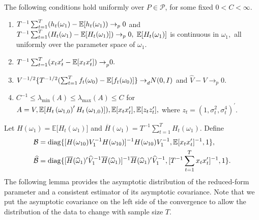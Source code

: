 \begin{assumpR}
    \label{assump:R}
    The following conditions hold uniformly over $P\in \mathcal{P}$, for some fixed $0 < C < \infty$.
    
    \begin{enumerate}
        \item $T^{-1}\sum_{t=1}^{T}(h_{t}(\omega_{1})-\operatorname{\mathbb{E}}[ h_{t}(\omega _{1}))\rightarrow _{p}0$ and $T^{-1}\sum_{t=1}^{T}(H_{t}(\omega _{1})-\operatorname{\mathbb{E}}[H_{t}(\omega _{1})])\rightarrow _{p}0,$ $\operatorname{\mathbb{E}}[H_{t}(\omega _{1})]$ is continuous in $\omega _{1},$ all uniformly over the parameter space of $\omega _{1}$.
        \item $T^{-1}\sum_{t=1}^{T}(x_{t}x_{t}^{\prime }-\operatorname{\mathbb{E}}[ x_{t}x_{t}^{\prime }{])\rightarrow }_{p}0.$
        \item $V^{-1/2}\{T^{-1/2}(\sum_{t=1}^{T}f_{t}(\omega _{0})-\operatorname{\mathbb{E}}[f_{t}(\omega _{0}){]\} \rightarrow }_{d}N(0,I)$ and $\widehat{V} -V\rightarrow _{p}0.$
        \item $C^{-1}\leq \lambda_{\min }(A)\leq \lambda_{\max }(A)\leq C$ for $A=V,\operatorname{\mathbb{E}}[H_{t}\left( \omega _{1,0}\right) ^{\prime }H_{t}\left( \omega _{1,0}\right) ]),\operatorname{\mathbb{E}}[x_{t}x_{t}^{\prime }],\operatorname{\mathbb{E}}[ z_{t}z_{t}^{\prime }],$ where $z_{t}=(1,\sigma _{t}^{2},\sigma _{t}^{4})^{\prime }.$
    \end{enumerate}
\end{assumpR}


Let $H(\omega _{1})=\mathbb{E[}H_{t}(\omega _{1})]$ and $\overline{H}(\omega _{1})=T^{-1}\sum_{t=1}^{T}H_{t}(\omega _{1}).$ Define
%
\begin{align}
%
    \mathcal{B} &= \diag\{[H(\omega _{10})V_{1}^{-1}H(\omega _{10})]^{-1}H(\omega _{10})V_{1}^{-1},\mathbb{E[}x_{t}x_{t}^{\prime }]^{-1},1\},  \notag \\
%
    \widehat{\mathcal{B}} &= \diag\{[\overline{H}(\widehat{\omega }_{1})^{\prime } \widehat{V}_{1}^{-1}\overline{H}(\widehat{\omega }_{1})]^{-1}\overline{H}( \widehat{\omega }_{1})^{\prime }\widehat{V}_{1}^{-1},[T^{-1}
\sum_{t=1}^{T}x_{t}x_{t}^{\prime }]^{-1},1\}.  
%
    \label{Fhat}
\end{align}
%
The following lemma provides the asymptotic distribution of the reduced-form parameter and a consistent estimator of its asymptotic covariance. Note that we put the asymptotic covariance on the left side of the convergence to allow the distribution of the data to change with sample size $T$.

